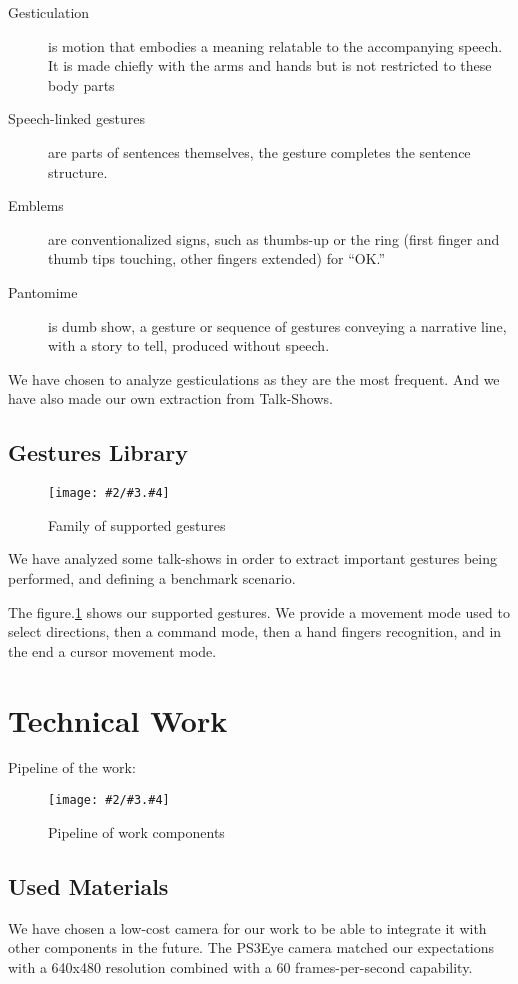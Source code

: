 \documentclass{llncs}
\newcommand\ignore[1]{}
\newcommand{\imagepathext}[5]{%
\begin{figure}[hbtp]
\hfil\texttt{[image: \#2/\#3.\#4]}\hfil
\caption{#5\label{#3}}
\end{figure}}
\newcommand{\png}[2]{\imagepathext{width=\columnwidth}{pics}{#1}{png}{#2}}
\begin{document}
\begin{description}
 \item[Gesticulation] is motion that embodies a meaning relatable to the
accompanying speech. It is made chiefly with the arms and hands but is not
restricted to these body parts
 \item[Speech-linked gestures] are parts of sentences themselves, the gesture completes the sentence structure.
 \item[Emblems] are conventionalized signs, such as thumbs-up or the ring (first
finger and thumb tips touching, other fingers extended) for ``OK.''
 \item[Pantomime] is dumb show, a gesture or sequence of gestures conveying a
narrative line, with a story to tell, produced without speech.
\end{description}


We have chosen to analyze gesticulations as they are the most frequent.
And we have also made our own extraction from Talk-Shows.


\subsection{Gestures Library}

\png{handg}{Family of supported gestures}

We have analyzed some talk-shows in order to extract important gestures being performed, and defining a benchmark scenario. 

The figure.\ref{handg} shows our supported gestures. We provide a movement mode
used to select directions, then a command mode, then a hand fingers recognition,
and in the end a cursor movement mode.

\ignore{
Explanation of the figures
Steps for skin-color based gesture detection
}

\section{Technical Work}
Pipeline of the work:
\png{pipeline}{Pipeline of work components}

\subsection{Used Materials}
We have chosen a low-cost camera for our work to be able to integrate it with other components in the future.
The PS3Eye camera matched our expectations with a 640x480 resolution combined with a 60 frames-per-second capability.
\end{document}
